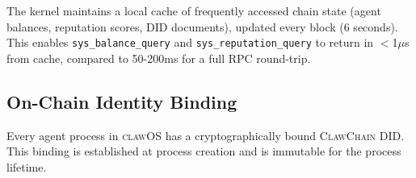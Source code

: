 \documentclass{article}
\newcommand{\clawos}{\textsc{clawOS}}
\newcommand{\clawchain}{\textsc{ClawChain}}
\begin{document}
The kernel maintains a local cache of frequently accessed chain state (agent balances, reputation scores, DID documents), updated every block (6 seconds). This enables \texttt{sys\_balance\_query} and \texttt{sys\_reputation\_query} to return in $<$1$\mu$s from cache, compared to 50-200ms for a full RPC round-trip.

\subsection{On-Chain Identity Binding}

Every agent process in \clawos{} has a cryptographically bound \clawchain{} DID. This binding is established at process creation and is immutable for the process lifetime.

\end{document}
